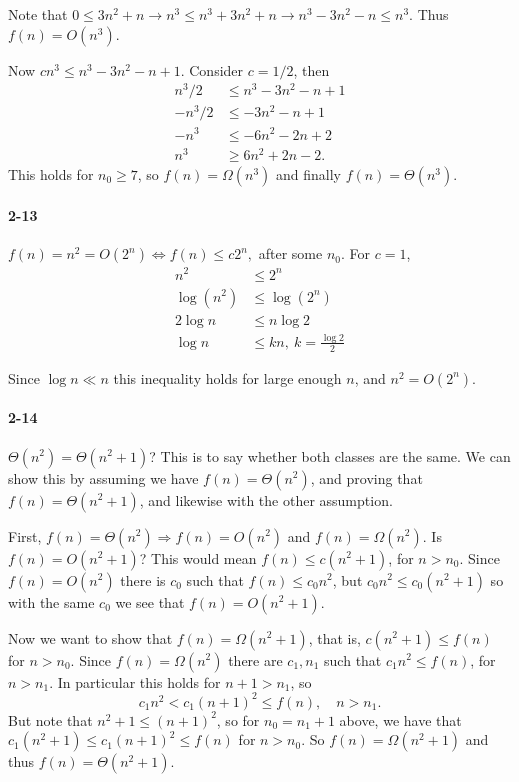 \documentclass{report}
\begin{document}
Note that $0 \le 3n^2 + n \rightarrow n^3 \le n^3 + 3n^2 + n \rightarrow n^3 - 3n^2 - n \le n^3$. Thus $f(n) = O(n^3)$.

Now $cn^3 \le n^3 - 3n^2 - n + 1.$ Consider $c = 1/2$, then
\begin{align*}
	n^3/2 &\le n^3 - 3n^2 - n + 1 \\
	-n^3/2 &\le -3n^2 - n + 1 \\
	-n^3 &\le -6n^2 - 2n + 2 \\
	n^3 &\ge 6n^2 + 2n - 2. 
\end{align*}
This holds for $n_0 \ge 7$, so $f(n) = \Omega(n^3)$ and finally $f(n) = \Theta(n^3)$.

\paragraph{2-13}$f(n) = n^2 = O\left(2^n\right) \Leftrightarrow f(n) \le c2^n,$ after some $n_0$. For $c = 1$,
\begin{align*}
	n^2 &\le 2^n \\
	\log(n^2) &\le \log(2^n) \\
	2 \log n &\le n\log 2 \\
	\log n &\le kn,\ k = \frac{\log 2}{2}
\end{align*}

Since $\log n \ll n$ this inequality holds for large enough $n$, and $n^2 = O(2^n)$.

\paragraph{2-14} $\Theta(n^2) = \Theta(n^2+1)$? This is to say whether both classes are the same. We can show this by assuming we have $f(n) = \Theta(n^2)$, and proving that $f(n) = \Theta(n^2+1)$, and likewise with the other assumption.

First, $f(n) = \Theta(n^2) \Rightarrow f(n) = O(n^2)$ and $f(n) = \Omega(n^2)$. Is $f(n) = O(n^2+1)$? This would mean $f(n) \le c\left(n^2+1\right)$, for $n > n_0$. Since $f(n) = O(n^2)$ there is $c_0$ such that $f(n) \le c_0 n^2$, but $c_0 n^2 \le c_0\left(n^2 + 1\right)$ so with the same $c_0$ we see that $f(n) = O(n^2+1)$.

Now we want to show that $f(n) = \Omega(n^2+1)$, that is, $c\left(n^2 + 1\right) \le f(n)$ for $n > n_0$. Since $f(n) = \Omega(n^2)$ there are $c_1, n_1$ such that $c_1 n^2 \le f(n)$, for $n > n_1$. In particular this holds for $n+1 > n_1$, so
\begin{equation*}
	c_1 n^2 < c_1 (n+1)^2 \le f(n), \quad n > n_1.
\end{equation*}
But note that $n^2 + 1 \le (n+1)^2$, so for $n_0 = n_1 + 1$ above, we have that $c_1\left(n^2 + 1\right) \le c_1 (n+1)^2 \le f(n)$ for $n > n_0$. So $f(n) = \Omega(n^2+1)$ and thus $f(n) = \Theta(n^2 + 1)$.
\end{document}
